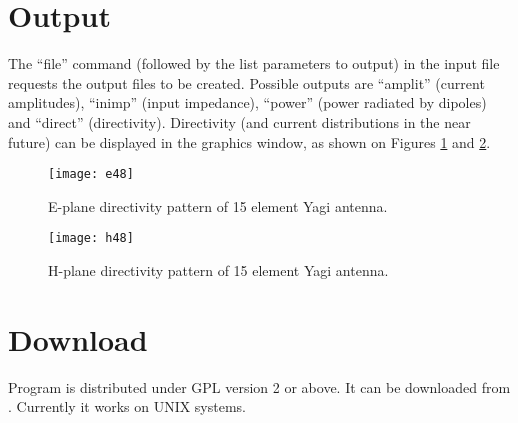 \documentclass{article}
\begin{document}
\section{Output}

The ``file'' command (followed by the list parameters to output) in
the input file requests the output files to be created. Possible
outputs are ``amplit'' (current amplitudes), ``inimp'' (input
impedance), ``power'' (power radiated by dipoles) and ``direct''
(directivity). Directivity (and current distributions in the near
future) can be displayed in the graphics window, as shown on Figures
\ref{fig:e48} and \ref{fig:h48}.

\begin{figure}
  \texttt{[image: e48]}
  \caption{\label{fig:e48}E-plane directivity pattern of 15 element
    Yagi antenna.}
\end{figure}

\begin{figure}
  \texttt{[image: h48]}
  \caption{\label{fig:h48}H-plane directivity pattern of 15 element
    Yagi antenna.}
\end{figure}

\section{Download}

Program is distributed under GPL version 2 or above. It can be
downloaded from
.
Currently it works on UNIX systems.
\end{document}
